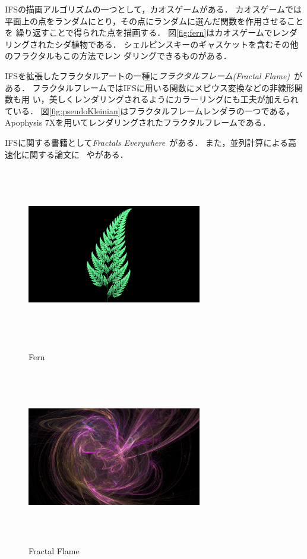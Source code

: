 IFSの描画アルゴリズムの一つとして，カオスゲームがある．
カオスゲームでは平面上の点をランダムにとり，その点にランダムに選んだ関数を作用させることを
繰り返すことで得られた点を描画する．
図\ref{fig:fern}はカオスゲームでレンダリングされたシダ植物である．
シェルピンスキーのギャスケットを含むその他のフラクタルもこの方法でレン
ダリングできるものがある．

IFSを拡張したフラクタルアートの一種に\emph{フラクタルフレーム}\textit{(Fractal
Flame)}~\cite{draves2003fractal}がある．
フラクタルフレームではIFSに用いる関数にメビウス変換などの非線形関数も用
い，美しくレンダリングされるようにカラーリングにも工夫が加えられている．
図\ref{fig:pseudoKleinian}はフラクタルフレームレンダラの一つである，
Apophysis 7Xを用いてレンダリングされたフラクタルフレームである．

IFSに関する書籍として\textit{Fractals
Everywhere}~\cite{BarnsleyMathematics201207}がある．
また，並列計算による高速化に関する論文に
~\cite{2010_fractal_flames}や\cite{Green:2005:GIF:1187112.1187128}がある．

\begin{figure}[htbp]
  \begin{minipage}{0.49\hsize}
   \center
   \includegraphics[width=3in, height=3in, keepaspectratio]{../img/fractal/fern.pdf}
   \caption{Fern}
   \label{fig:fern}
 \end{minipage}
 \begin{minipage}{0.49\hsize}
  \center
  \includegraphics[width=3in, height=3in, keepaspectratio]{../img/fractal/fractalFlame.pdf}
  \caption{Fractal Flame}
  \label{fig:fractalFlame}
 \end{minipage}
\end{figure}

\clearpage
